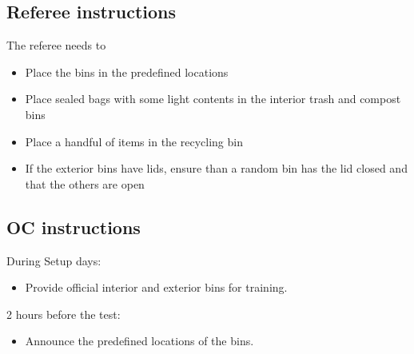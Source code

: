 \subsection{Referee instructions}

The referee needs to
\begin{itemize}
	\item Place the bins in the predefined locations
	\item Place sealed bags with some light contents in the interior trash and compost bins
	\item Place a handful of items in the recycling bin
	\item If the exterior bins have lids, ensure than a random bin has the lid closed and that the others are open
\end{itemize}

\subsection{OC instructions}
During Setup days:
\begin{itemize}
	\item Provide official interior and exterior bins for training.
\end{itemize}

2 hours before the test:
\begin{itemize}
	\item Announce the predefined locations of the bins.
\end{itemize}

% 


